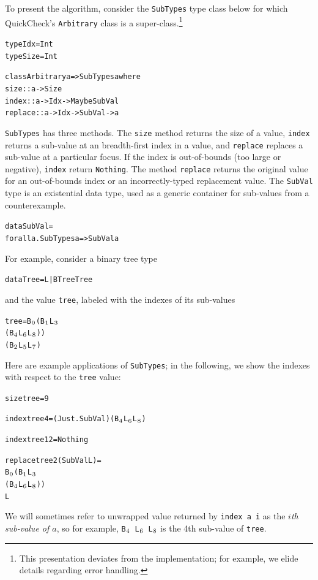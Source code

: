 \documentclass[10pt]{sigplanconf}
\newenvironment{code}{\begin{alltt}}{\end{alltt}}
\newcommand{\ttp}[1]{\texttt{#1}}
\newcommand{\sub}[1]{\(\sb{#1}\)}
\begin{document}
To present the algorithm, consider the \ttp{SubTypes} type class below for which
QuickCheck's \ttp{Arbitrary} class is a super-class.\footnote{This presentation
  deviates from the implementation; for example, we elide details regarding
  error handling.}
%
\begin{code}
type Idx = Int
type Size = Int

class Arbitrary a => SubTypes a where
  size    :: a -> Size
  index   :: a -> Idx -> Maybe SubVal
  replace :: a -> Idx -> SubVal -> a
\end{code}
%
\noindent
\ttp{SubTypes} has three methods.  The \ttp{size} method returns the size of a
value, \ttp{index} returns a sub-value at an breadth-first index in a value, and
\ttp{replace} replaces a sub-value at a particular focus.  If the index is
out-of-bounds (too large or negative), \ttp{index} return \ttp{Nothing}.  The
method \ttp{replace} returns the original value for an out-of-bounds index or an
incorrectly-typed replacement value.  The \ttp{SubVal} type is an existential
data type, used as a generic container for sub-values from a counterexample.
%
\begin{code}
data SubVal =
  forall a. SubTypes a => SubVal a
\end{code}
%
\noindent
For example, consider a binary tree type
%
\begin{code}
data Tree = L | B Tree Tree
\end{code}
%
\noindent
and the value \ttp{tree}, labeled with the indexes of its sub-values
%
\begin{code}
tree = B\sub{0} (B\sub{1} L\sub{3}
             (B\sub{4} L\sub{6} L\sub{8}))
          (B\sub{2} L\sub{5} L\sub{7})
\end{code}
%
\noindent
Here are example applications of \ttp{SubTypes}; in the following, we show
the indexes with respect to the \ttp{tree} value:
%
\begin{code}
size tree = 9

index tree 4 = (Just . SubVal) (B\sub{4} L\sub{6} L\sub{8})

index tree 12 = Nothing

replace tree 2 (SubVal L) =
  B\sub{0} (B\sub{1} L\sub{3}
        (B\sub{4} L\sub{6} L\sub{8}))
     L
\end{code}
%
\noindent
We will sometimes refer to unwrapped value returned by \ttp{index a i} as the
\emph{$i$th sub-value of $a$}, so for example, \ttp{B\sub{4} L\sub{6} L\sub{8}}
is the 4th sub-value of \ttp{tree}.
\end{document}
